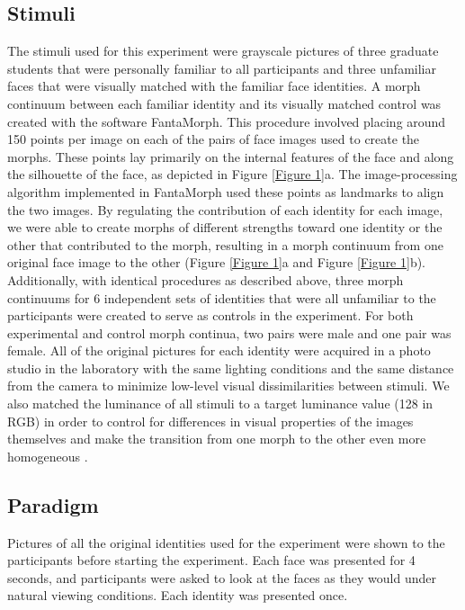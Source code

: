 \documentclass[10pt,letterpaper]{article}
\begin{document}
\subsection*{Stimuli}
The stimuli used for this experiment were grayscale pictures of three graduate students that were personally familiar to all participants and three unfamiliar faces that were visually matched with the familiar face identities. A morph continuum between each familiar identity and its visually matched control was created with the software FantaMorph. This procedure involved placing around 150 points per image on each of the pairs of face images used to create the morphs. These points lay primarily on the internal features of the face and along the silhouette of the face, as depicted in Figure \ref{Figure 1}a. The image-processing algorithm implemented in FantaMorph used these points as landmarks to align the two images. By regulating the contribution of each identity for each image, we were able to create morphs of different strengths toward one identity or the other that contributed to the morph, resulting in a morph continuum from one original face image to the other (Figure \ref{Figure 1}a and Figure \ref{Figure 1}b). Additionally, with identical procedures as described above, three morph continuums for 6 independent sets of identities that were all unfamiliar to the participants were created to serve as controls in the experiment. For both experimental and control morph continua, two pairs were male and one pair was female. All of the original pictures for each identity were acquired in a photo studio in the laboratory with the same lighting conditions and the same distance from the camera to minimize low-level visual dissimilarities between stimuli. We also matched the luminance of all stimuli to a target luminance value (128 in RGB) in order to control for differences in visual properties of the images themselves and make the transition from one morph to the other even more homogeneous \cite{willenbockel2010controlling}.

\subsection*{Paradigm}
Pictures of all the original identities used for the experiment were shown to the participants before starting the experiment. Each face was presented for 4 seconds, and participants were asked to look at the faces as they would under natural viewing conditions. Each identity was presented once. 
\end{document}
